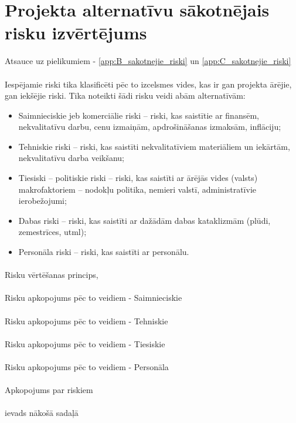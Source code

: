 \section{Projekta alternatīvu sākotnējais risku izvērtējums}
Atsauce uz pielikumiem - \ref{app:B_sakotnejie_riski} un \ref{app:C_sakotnejie_riski}
\paragraph{}
Iespējamie riski tika klasificēti pēc to izcelsmes vides, kas ir gan projekta ārējie, gan
iekšējie riski. Tika noteikti šādi risku veidi abām alternatīvām:
\begin{itemize}
    \item Saimnieciskie jeb komerciālie riski – riski, kas saistītie ar finansēm, nekvalitatīvu darbu,
cenu izmaiņām, apdrošināšanas izmaksām, inflāciju;
    \item Tehniskie riski – riski, kas saistīti nekvalitatīviem materiāliem un iekārtām, nekvalitatīvu
darba veikšanu;
    \item Tiesiski – politiskie riski – riski, kas saistīti ar ārējās vides (valsts) makrofaktoriem –
nodokļu politika, nemieri valstī, administratīvie ierobežojumi;
    \item Dabas riski – riski, kas saistīti ar dažādām dabas kataklizmām (plūdi, zemestrīces, utml);
    \item Personāla riski – riski, kas saistīti ar personālu.
\end{itemize}
\paragraph{}
Risku vērtēšanas princips,
\paragraph{}
Risku apkopojums pēc to veidiem - Saimnieciskie
\paragraph{}
Risku apkopojums pēc to veidiem - Tehniskie
\paragraph{}
Risku apkopojums pēc to veidiem - Tiesiskie
\paragraph{}
Risku apkopojums pēc to veidiem - Personāla
\paragraph{}
Apkopojums par riskiem
\paragraph{}
ievads nākošā sadaļā


